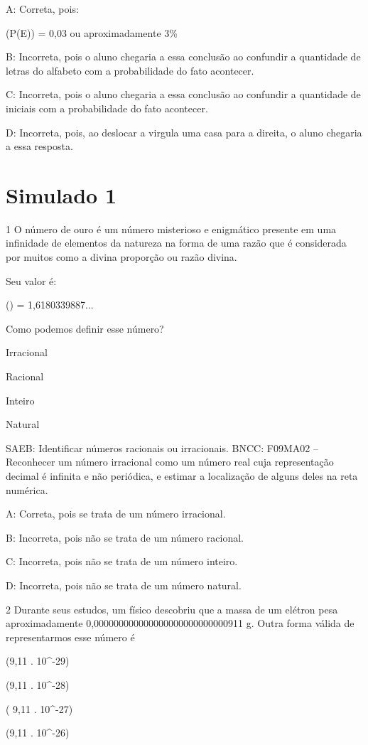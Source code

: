{A: Correta, pois:

(P(E)) = 0,03 ou aproximadamente 3\%

B: Incorreta, pois o aluno chegaria a essa conclusão ao confundir a
quantidade de letras do alfabeto com a probabilidade do fato acontecer.

C: Incorreta, pois o aluno chegaria a essa conclusão ao confundir a
quantidade de iniciais com a probabilidade do fato acontecer.

D: Incorreta, pois, ao deslocar a virgula uma casa para a direita, o
aluno chegaria a essa resposta.


\section{Simulado 1}

\num{1} O número de ouro é um número misterioso e enigmático presente em uma
infinidade de elementos da natureza na forma de uma razão que é
considerada por muitos como a divina proporção ou razão divina.

Seu valor é:

() = 1,6180339887...

Como podemos definir esse número?
\item Irracional
\item Racional
\item Inteiro
\item Natural

SAEB: Identificar números racionais ou irracionais. BNCC: F09MA02 --
Reconhecer um número irracional como um número real cuja representação
decimal é infinita e não periódica, e estimar a localização de alguns
deles na reta numérica.

A: Correta, pois se trata de um número irracional.

B: Incorreta, pois não se trata de um número racional.

C: Incorreta, pois não se trata de um número inteiro.

D: Incorreta, pois não se trata de um número natural.

\num{2} Durante seus estudos, um físico descobriu que a massa de um elétron
pesa aproximadamente 0,000000000000000000000000000911 g. Outra forma
válida de representarmos esse número é
\item (9,11 . 10^{-29})
\item (9,11 . 10^{-28})
\item ( 9,11 . 10^{-27})
\item (9,11 . 10^{-26})

}
